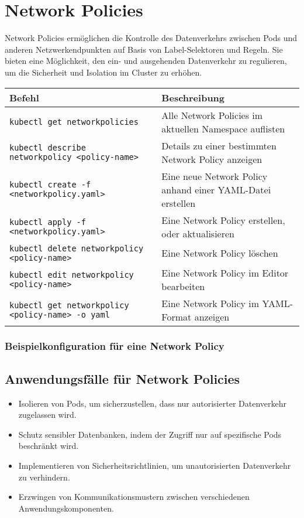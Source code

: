 \newpage

\section{Network Policies}
Network Policies ermöglichen die Kontrolle des Datenverkehrs zwischen Pods und anderen Netzwerkendpunkten auf Basis von Label-Selektoren und Regeln. Sie bieten eine Möglichkeit, den ein- und ausgehenden Datenverkehr zu regulieren, um die Sicherheit und Isolation im Cluster zu erhöhen. \\

\noindent
\begin{tabular}{
|p{}|p{}|}
\hline
\textbf{Befehl} & \textbf{Beschreibung} \\
\hline
\texttt{kubectl get networkpolicies} & Alle Network Policies im aktuellen Namespace auflisten \\
\texttt{kubectl describe networkpolicy <policy-name>} & Details zu einer bestimmten Network Policy anzeigen \\
\texttt{kubectl create -f <networkpolicy.yaml>} & Eine neue Network Policy anhand einer YAML-Datei erstellen \\
\texttt{kubectl apply -f <networkpolicy.yaml>} & Eine Network Policy erstellen, oder aktualisieren\\
\texttt{kubectl delete networkpolicy <policy-name>} & Eine Network Policy löschen \\
\texttt{kubectl edit networkpolicy <policy-name>} & Eine Network Policy im Editor bearbeiten \\
\texttt{kubectl get networkpolicy <policy-name> -o yaml} & Eine Network Policy im YAML-Format anzeigen \\
\hline
\end{tabular}

\subsubsection{Beispielkonfiguration für eine Network Policy}

\newpage
\subsection{Anwendungsfälle für Network Policies}
\begin{itemize}
    \item Isolieren von Pods, um sicherzustellen, dass nur autorisierter Datenverkehr zugelassen wird.
    \item Schutz sensibler Datenbanken, indem der Zugriff nur auf spezifische Pods beschränkt wird.
    \item Implementieren von Sicherheitsrichtlinien, um unautorisierten Datenverkehr zu verhindern.
    \item Erzwingen von Kommunikationsmustern zwischen verschiedenen Anwendungskomponenten.
\end{itemize}

